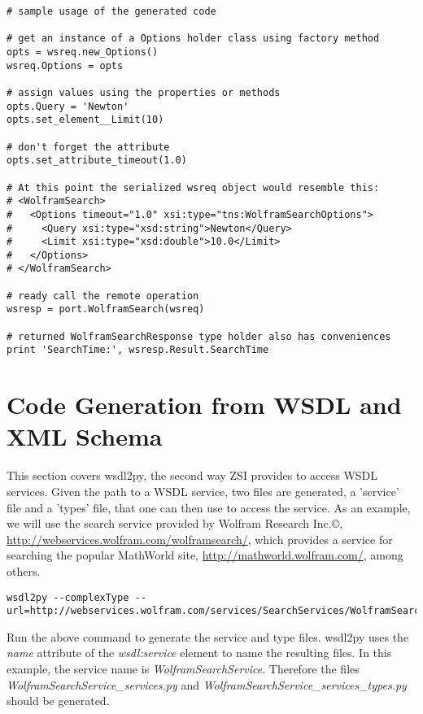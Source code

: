 \begin{verbatim}
# sample usage of the generated code

# get an instance of a Options holder class using factory method
opts = wsreq.new_Options()
wsreq.Options = opts

# assign values using the properties or methods
opts.Query = 'Newton'
opts.set_element__Limit(10)

# don't forget the attribute
opts.set_attribute_timeout(1.0)

# At this point the serialized wsreq object would resemble this:
# <WolframSearch>
#   <Options timeout="1.0" xsi:type="tns:WolframSearchOptions">
#     <Query xsi:type="xsd:string">Newton</Query>
#     <Limit xsi:type="xsd:double">10.0</Limit>
#   </Options>
# </WolframSearch>

# ready call the remote operation
wsresp = port.WolframSearch(wsreq)

# returned WolframSearchResponse type holder also has conveniences
print 'SearchTime:', wsresp.Result.SearchTime
\end{verbatim}

\section{Code Generation from WSDL and XML Schema}

This section covers wsdl2py, the second way ZSI provides to access WSDL
services.  Given the path to a WSDL service, two files are generated, a 
'service' file and a 'types' file, that one can then use to access the
service.  As an example, we will use the search service provided by Wolfram
Research Inc.\copyright{}, \url{http://webservices.wolfram.com/wolframsearch/}, 
which provides a service for searching the popular MathWorld site, 
\url{http://mathworld.wolfram.com/}, among others.

\begin{verbatim}
wsdl2py --complexType --url=http://webservices.wolfram.com/services/SearchServices/WolframSearch2.wsdl
\end{verbatim}

Run the above command to generate the service and type files.  wsdl2py uses
the {\it name} attribute of the {\it wsdl:service} element to name the resulting files.
In this example, the service name is {\it WolframSearchService}.  Therefore the files
{\it WolframSearchService_services.py} and {\it WolframSearchService_services_types.py}
should be generated.

